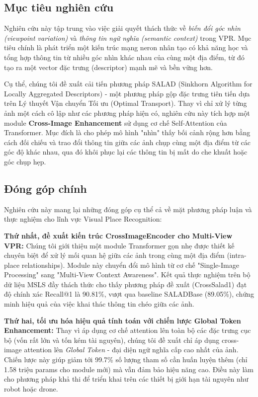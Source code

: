 \documentclass[12pt,a4paper]{article}
\begin{document}
    \subsection{Mục tiêu nghiên cứu}

    Nghiên cứu này tập trung vào việc giải quyết thách thức về \textit{biến đổi góc nhìn (viewpoint variation)} và \textit{thông tin ngữ nghĩa (semantic context)} trong VPR. Mục tiêu chính là phát triển một kiến trúc mạng neron nhân tạo có khả năng học và tổng hợp thông tin từ nhiều góc nhìn khác nhau của cùng một địa điểm, từ đó tạo ra một vector đặc trưng (descriptor) mạnh mẽ và bền vững hơn.

    Cụ thể, chúng tôi đề xuất cải tiến phương pháp SALAD (Sinkhorn Algorithm for Locally Aggregated Descriptors) \cite{izquierdo2024salad} - một phương pháp gộp đặc trưng tiên tiến dựa trên Lý thuyết Vận chuyển Tối ưu (Optimal Transport). Thay vì chỉ xử lý từng ảnh một cách cô lập như các phương pháp hiện có, nghiên cứu này tích hợp một module \textbf{Cross-Image Enhancement} sử dụng cơ chế Self-Attention của Transformer. Mục đích là cho phép mô hình "nhìn" thấy bối cảnh rộng hơn bằng cách đối chiếu và trao đổi thông tin giữa các ảnh chụp cùng một địa điểm từ các góc độ khác nhau, qua đó khôi phục lại các thông tin bị mất do che khuất hoặc góc chụp hẹp.

    \subsection{Đóng góp chính}

    Nghiên cứu này mang lại những đóng góp cụ thể cả về mặt phương pháp luận và thực nghiệm cho lĩnh vực Visual Place Recognition:

    \textbf{Thứ nhất, đề xuất kiến trúc CrossImageEncoder cho Multi-View VPR:} Chúng tôi giới thiệu một module Transformer gọn nhẹ được thiết kế chuyên biệt để xử lý mối quan hệ giữa các ảnh trong cùng một địa điểm (intra-place relationships). Module này chuyển đổi mô hình từ cơ chế "Single-Image Processing" sang "Multi-View Context Awareness". Kết quả thực nghiệm trên bộ dữ liệu MSLS đầy thách thức cho thấy phương pháp đề xuất (CrossSalad1) đạt độ chính xác Recall@1 là 90.81\%, vượt qua baseline SALADBase (89.05\%), chứng minh hiệu quả của việc khai thác thông tin chéo giữa các ảnh.

    \textbf{Thứ hai, tối ưu hóa hiệu quả tính toán với chiến lược Global Token Enhancement:} Thay vì áp dụng cơ chế attention lên toàn bộ các đặc trưng cục bộ (vốn rất lớn và tốn kém tài nguyên), chúng tôi đề xuất chỉ áp dụng cross-image attention lên \textit{Global Token} - đại diện ngữ nghĩa cấp cao nhất của ảnh. Chiến lược này giúp giảm tới 99.7\% số lượng tham số cần huấn luyện thêm (chỉ 1.58 triệu params cho module mới) mà vẫn đảm bảo hiệu năng cao. Điều này làm cho phương pháp khả thi để triển khai trên các thiết bị giới hạn tài nguyên như robot hoặc drone.
\end{document}
